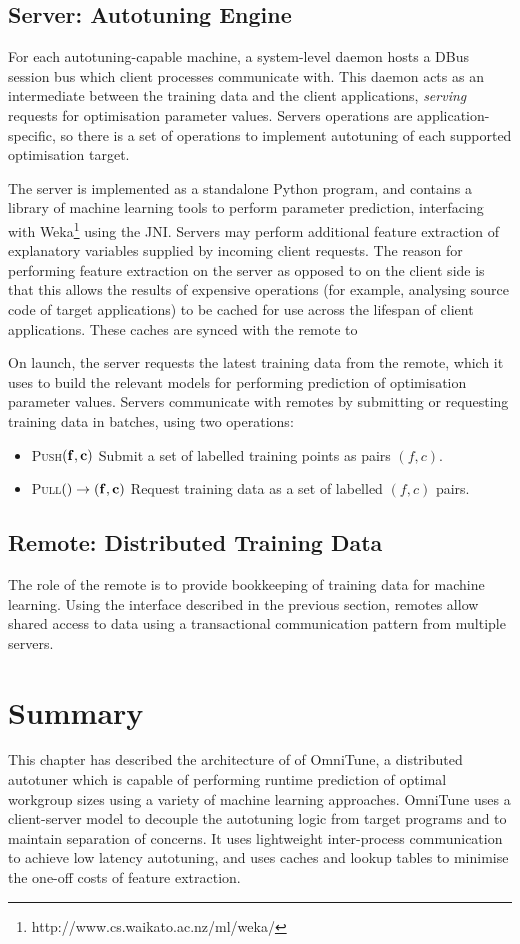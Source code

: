 \subsection{Server: Autotuning Engine}

For each autotuning-capable machine, a system-level daemon hosts a
DBus session bus which client processes communicate with. This daemon
acts as an intermediate between the training data and the client
applications, \emph{serving} requests for optimisation parameter
values. Servers operations are application-specific, so there is a set
of operations to implement autotuning of each supported optimisation
target.

The server is implemented as a standalone Python program, and contains
a library of machine learning tools to perform parameter prediction,
interfacing with Weka\footnote{http://www.cs.waikato.ac.nz/ml/weka/}
using the JNI. Servers may perform additional feature extraction of
explanatory variables supplied by incoming client requests. The reason
for performing feature extraction on the server as opposed to on the
client side is that this allows the results of expensive operations
(for example, analysing source code of target applications) to be
cached for use across the lifespan of client applications. These
caches are synced with the remote to

On launch, the server requests the latest training data from the
remote, which it uses to build the relevant models for performing
prediction of optimisation parameter values. Servers communicate with
remotes by submitting or requesting training data in batches, using
two operations:
%
\begin{itemize}
\item \textsc{Push}$(\bf{f}, \bf{c})$ Submit a set of labelled training
  points as pairs $(f,c)$.
\item \textsc{Pull}$() \to (\bf{f}, \bf{c})$ Request training data as a
  set of labelled $(f,c)$ pairs.
\end{itemize}


\subsection{Remote: Distributed Training Data}

The role of the remote is to provide bookkeeping of training data for
machine learning. Using the interface described in the previous
section, remotes allow shared access to data using a transactional
communication pattern from multiple servers.


\section{Summary}

This chapter has described the architecture of of OmniTune, a
distributed autotuner which is capable of performing runtime
prediction of optimal workgroup sizes using a variety of machine
learning approaches. OmniTune uses a client-server model to decouple
the autotuning logic from target programs and to maintain separation
of concerns. It uses lightweight inter-process communication to
achieve low latency autotuning, and uses caches and lookup tables to
minimise the one-off costs of feature extraction.
